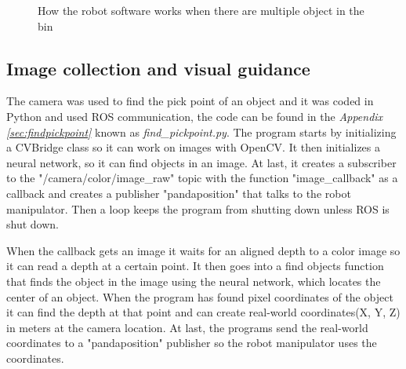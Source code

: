 \begin{figure}[h]
    \hfill
    \caption{How the robot software works when there are multiple object in the bin}
    \label{figure: robotworkingv2}
\end{figure}


\subsection{Image collection and visual guidance}\label{camera}
The camera was used to find the pick point of an object and it was coded in Python and used ROS communication, the code can be found in the \textit{Appendix \ref{sec:findpickpoint}} known as \textit{find\_pickpoint.py}. 
The program starts by initializing a CVBridge class so it can work on images with OpenCV. It then initializes a neural network, so it can find objects in an image. At last, it creates a subscriber to the "/camera/color/image\_raw" topic with the function "image\_callback" as a callback and creates a publisher "pandaposition" that talks to the robot manipulator. Then a loop keeps the program from shutting down unless ROS is shut down.

When the callback gets an image it waits for an aligned depth to a color image so it can read a depth at a certain point. It then goes into a find objects function that finds the object in the image using the neural network, which locates the center of an object. When the program has found pixel coordinates of the object it can find the depth at that point and can create real-world coordinates(X, Y, Z) in meters at the camera location. At last, the programs send the real-world coordinates to a "pandaposition" publisher so the robot manipulator uses the coordinates.

